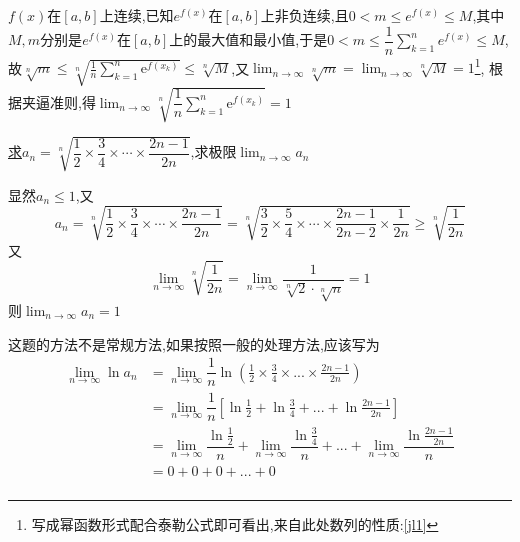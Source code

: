 \documentclass[8pt a4paper, oneside, UTF8]{ctexbook}
\begin{document}
\begin{sloppypar}
\begin{problem}
    \end{problem}
    \begin{solution}
        $f(x)$在$[a,b]$上连续,已知$e^{f(x)}$在$[a,b]$上非负连续,且$0<m \leqslant e^{f(x)} \leqslant M$,其中$M,m$分别是$e^{f(x)}$在$[a,b]$上的最大值和最小值,于是$0<m\leqslant \dfrac{1}{n} \sum_{k=1}^{n}e^{f(x)} \leqslant M$,故$\sqrt[n]{m}\leqslant\sqrt[n]{\frac1n\sum_{k=1}^n\mathrm{e}^{f(x_k)}}\leqslant\sqrt[n]{M}$,又$\lim_{n\to\infty}\sqrt[n]{m}=\lim_{n\to\infty}\sqrt[n]{M}=1$\footnote{写成幂函数形式配合泰勒公式即可看出,来自此处数列的性质:\ref{jl1}}, 根据夹逼准则,得$\lim_{n\to\infty}\sqrt[n]{\dfrac1n\sum_{k=1}^n\mathrm{e}^{f(x_k)}}=1$
    \end{solution}
    \begin{problem}
    \uline{求}$a_n=\sqrt[n]{\dfrac12\times\dfrac34\times\cdots\times\dfrac{2n-1}{2n}}$,求极限$\lim_{n \to \infty}a_n$
    \end{problem}
    \begin{solution}
        显然$a_n \leqslant 1$,又
        $$
            a_n=\sqrt[n]{\dfrac12\times\dfrac34\times\cdots\times\dfrac{2n-1}{2n}}=\sqrt[n]{\dfrac32\times\dfrac54\times\cdots\times\dfrac{2n-1}{2n-2}\times\dfrac1{2n}}\geqslant\sqrt[n]{\dfrac1{2n}}
        $$
        又
        $$
            \lim_{n\to\infty}\sqrt[n]{\dfrac1{2n}}=\lim_{n\to\infty}\dfrac1{\sqrt[n]{2}\cdot\sqrt[n]{n}}=1
        $$
        则$\lim_{n\to\infty}a_n=1$
    \end{solution}
    \begin{note}
        这题的方法不是常规方法,如果按照一般的处理方法,应该写为
        \begin{align*}
            \lim_{n \to \infty}\ln a_n & =\lim_{n \to \infty}\dfrac{1}{n}\ln(\frac{1}{2}\times \frac{3}{4} \times ... \times \frac{2n-1}{2n})                                                \\
                                       & = \lim_{n \to \infty} \dfrac{1}{n}[\ln \frac{1}{2}+\ln \frac{3}{4}+...+\ln \frac{2n-1}{2n}]                                                         \\
                                       & = \lim_{n \to \infty}\dfrac{\ln \frac{1}{2}}{n}+\lim_{n \to \infty}\dfrac{\ln \frac{3}{4}}{n}+...+\lim_{n \to \infty}\dfrac{\ln \frac{2n-1}{2n}}{n} \\
                                       & = 0+0+0+...+0                                                                                                                                       \\

\end{align*}
\end{note}
\end{sloppypar}
\end{document}
